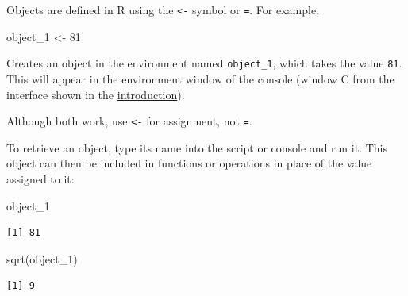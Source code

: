 \documentclass[
  letterpaper,
  DIV=11,
  numbers=noendperiod]{scrreprt}
\newenvironment{Shaded}{\begin{snugshade}}{\end{snugshade}}
\newcommand{\DecValTok}[1]{\textcolor[rgb]{0.68,0.00,0.00}{#1}}
\newcommand{\FunctionTok}[1]{\textcolor[rgb]{0.28,0.35,0.67}{#1}}
\newcommand{\NormalTok}[1]{\textcolor[rgb]{0.00,0.23,0.31}{#1}}
\newcommand{\OtherTok}[1]{\textcolor[rgb]{0.00,0.23,0.31}{#1}}
\begin{document}
Objects are defined in R using the \texttt{\textless{}-} symbol or
\texttt{=}. For example,

\begin{Shaded}
\begin{Highlighting}[]
\NormalTok{object\_1 }\OtherTok{\textless{}{-}} \DecValTok{81}
\end{Highlighting}
\end{Shaded}

Creates an object in the environment named \texttt{object\_1}, which
takes the value \texttt{81}. This will appear in the environment window
of the console (window C from the interface shown in the
\href{introduction.qmd}{introduction}).

\begin{tcolorbox}[enhanced jigsaw, bottomrule=.15mm, left=2mm, leftrule=.75mm, bottomtitle=1mm, coltitle=black, colbacktitle=quarto-callout-tip-color!10!white, toptitle=1mm, arc=.35mm, breakable, title=\textcolor{quarto-callout-tip-color}{\faLightbulb}\hspace{0.5em}{Style tip}, rightrule=.15mm, toprule=.15mm, opacityback=0, opacitybacktitle=0.6, titlerule=0mm, colback=white, colframe=quarto-callout-tip-color-frame]

Although both work, use \texttt{\textless{}-} for assignment, not
\texttt{=}.

\end{tcolorbox}

To retrieve an object, type its name into the script or console and run
it. This object can then be included in functions or operations in place
of the value assigned to it:

\begin{Shaded}
\begin{Highlighting}[]
\NormalTok{object\_1}
\end{Highlighting}
\end{Shaded}

\begin{verbatim}
[1] 81
\end{verbatim}

\begin{Shaded}
\begin{Highlighting}[]
\FunctionTok{sqrt}\NormalTok{(object\_1)}
\end{Highlighting}
\end{Shaded}

\begin{verbatim}
[1] 9
\end{verbatim}
\end{document}
